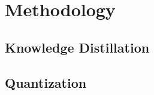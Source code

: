 \section{Methodology}

\cite{xia2023diffir}

\subsection{Knowledge Distillation}



\subsection{Quantization}